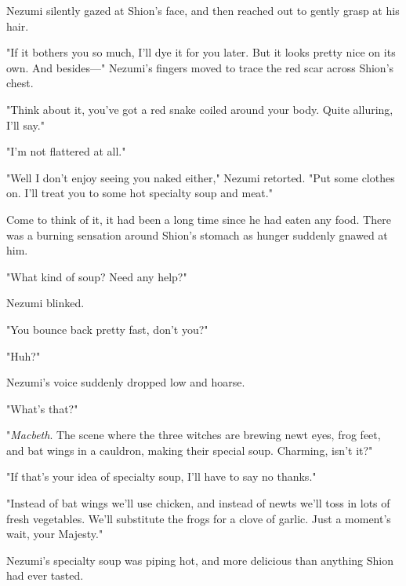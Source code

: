 Nezumi silently gazed at Shion's face, and then reached out to gently
grasp at his hair.

"If it bothers you so much, I'll dye it for you later. But it looks
pretty nice on its own. And besides---" Nezumi's fingers moved to trace
the red scar across Shion's chest.

"Think about it, you've got a red snake coiled around your body. Quite
alluring, I'll say."

"I'm not flattered at all."

"Well I don't enjoy seeing you naked either," Nezumi retorted. "Put some
clothes on. I'll treat you to some hot specialty soup and meat."

Come to think of it, it had been a long time since he had eaten any
food. There was a burning sensation around Shion's stomach as hunger
suddenly gnawed at him.

"What kind of soup? Need any help?"

Nezumi blinked.

"You bounce back pretty fast, don't you?"

"Huh?"

Nezumi's voice suddenly dropped low and hoarse.


"What's that?"

"\emph{Macbeth}. The scene where the three witches are brewing newt eyes, frog
feet, and bat wings in a cauldron, making their special soup. Charming,
isn't it?"

"If that's your idea of specialty soup, I'll have to say no thanks."

"Instead of bat wings we'll use chicken, and instead of newts we'll toss
in lots of fresh vegetables. We'll substitute the frogs for a clove of
garlic. Just a moment's wait, your Majesty."

Nezumi's specialty soup was piping hot, and more delicious than anything
Shion had ever tasted.